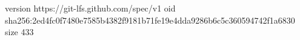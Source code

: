 version https://git-lfs.github.com/spec/v1
oid sha256:2ed4fc0f7480e7585b4382f9181b71fe19e4dda9286b6c5c360594742f1a6830
size 433
